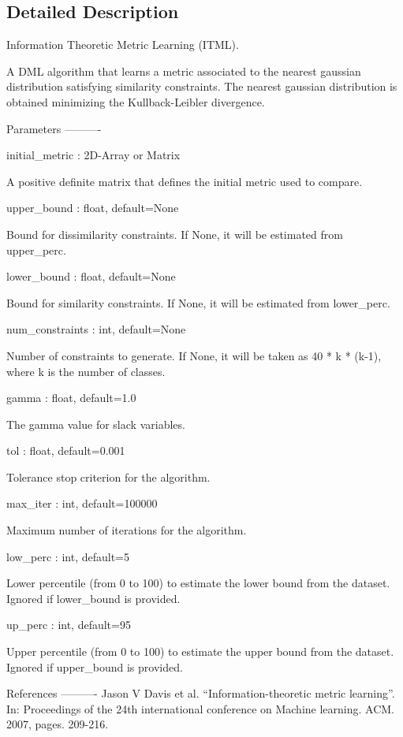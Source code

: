 \subsection{Detailed Description}
\begin{DoxyVerb}Information Theoretic Metric Learning (ITML).

A DML algorithm that learns a metric associated to the nearest gaussian distribution satisfying similarity constraints.
The nearest gaussian distribution is obtained minimizing the Kullback-Leibler divergence.

Parameters
----------

initial_metric : 2D-Array or Matrix

        A positive definite matrix that defines the initial metric used to compare.

upper_bound : float, default=None

        Bound for dissimilarity constraints. If None, it will be estimated from upper_perc.

lower_bound : float, default=None

        Bound for similarity constraints. If None, it will be estimated from lower_perc.

num_constraints : int, default=None

        Number of constraints to generate. If None, it will be taken as 40 * k * (k-1), where k is the number of classes.

gamma : float, default=1.0

        The gamma value for slack variables.

tol : float, default=0.001

        Tolerance stop criterion for the algorithm.

max_iter : int, default=100000

        Maximum number of iterations for the algorithm.

low_perc : int, default=5

        Lower percentile (from 0 to 100) to estimate the lower bound from the dataset. Ignored if lower_bound is provided.

up_perc : int, default=95

        Upper percentile (from 0 to 100) to estimate the upper bound from the dataset. Ignored if upper_bound is provided.

References
----------
    Jason V Davis et al. “Information-theoretic metric learning”. In: Proceedings of the 24th
    international conference on Machine learning. ACM. 2007, pages. 209-216.\end{DoxyVerb}
 

